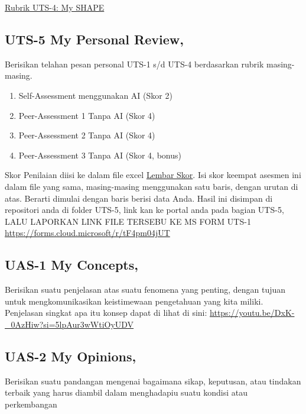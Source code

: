 \documentclass[
  letterpaper,
  DIV=11,
  numbers=noendperiod]{scrreprt}
\providecommand{\tightlist}{%
  \setlength{\itemsep}{0pt}\setlength{\parskip}{0pt}}
\begin{document}
\href{./asesmen/Rubrik_II-2100_CSV/UTS-4.csv}{Rubrik UTS-4: My SHAPE}

\subsection*{UTS-5 My Personal Review,}\label{uts-5-my-personal-review}

Berisikan telahan pesan personal UTS-1 s/d UTS-4 berdasarkan rubrik
masing-masing.

\begin{enumerate}
\def\labelenumi{\arabic{enumi}.}
\tightlist
\item
  Self-Assessment menggunakan AI (Skor 2)
\item
  Peer-Assessment 1 Tanpa AI (Skor 4)
\item
  Peer-Assessment 2 Tanpa AI (Skor 4)
\item
  Peer-Assessment 3 Tanpa AI (Skor 4, bonus)
\end{enumerate}

Skor Penilaian diisi ke dalam file excel
\href{./asesmen/UTS-5_Skor.xlsx}{Lembar Skor}. Isi skor keempat asesmen
ini dalam file yang sama, masing-masing menggunakan satu baris, dengan
urutan di atas. Berarti dimulai dengan baris berisi data Anda. Hasil ini
disimpan di repositori anda di folder UTS-5, link kan ke portal anda
pada bagian UTS-5, LALU LAPORKAN LINK FILE TERSEBU KE MS FORM UTS-1
\url{https://forms.cloud.microsoft/r/tF4pm04jUT}

\subsection*{UAS-1 My Concepts,}\label{uas-1-my-concepts}

Berisikan suatu penjelasan atas suatu fenomena yang penting, dengan
tujuan untuk mengkomunikasikan keistimewaan pengetahuan yang kita
miliki. Penjelasan singkat apa itu konsep dapat di lihat di sini:
\url{https://youtu.be/DxK-_0AzHiw?si=5lpAur3wWtiOyUDV}

\subsection*{UAS-2 My Opinions,}\label{uas-2-my-opinions}

Berisikan suatu pandangan mengenai bagaimana sikap, keputusan, atau
tindakan terbaik yang harus diambil dalam menghadapiu suatu kondisi atau
perkembangan
\end{document}
